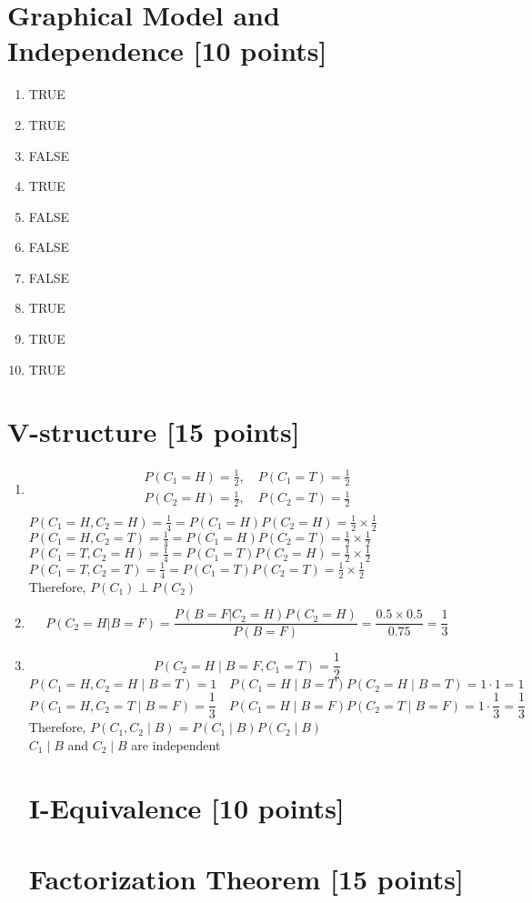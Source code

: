 \documentclass[12pt,a4paper]{article}
\begin{document}
\section{Graphical Model and Independence [10 points]}

\begin{enumerate}
  \item TRUE
  \item TRUE
  \item FALSE
  \item TRUE
  \item FALSE
  \item FALSE
  \item FALSE
  \item TRUE
  \item TRUE
  \item TRUE
\end{enumerate}

\section{V-structure [15 points]}
\begin{enumerate}
  \item
  \begin{align}
  \nonumber P(C_1=H)=\frac{1}{2},\quad P(C_1=T)=\frac{1}{2}\\
  \nonumber P(C_2=H)=\frac{1}{2},\quad P(C_2=T)=\frac{1}{2}\\
  \end{align}
  $P(C_1=H,C_2=H)=\frac{1}{4}=P(C_1=H)P(C_2=H)=\frac{1}{2}\times\frac{1}{2}$\\
  $P(C_1=H,C_2=T)=\frac{1}{4}=P(C_1=H)P(C_2=T)=\frac{1}{2}\times\frac{1}{2}$\\
  $P(C_1=T,C_2=H)=\frac{1}{4}=P(C_1=T)P(C_2=H)=\frac{1}{2}\times\frac{1}{2}$\\
  $P(C_1=T,C_2=T)=\frac{1}{4}=P(C_1=T)P(C_2=T)=\frac{1}{2}\times\frac{1}{2}$\\
  Therefore, $P(C_1)\perp P(C_2)$
  \item
  $$P(C_2=H|B=F)=\frac{P(B=F|C_2=H)P(C_2=H)}{P(B=F)}=\frac{0.5\times0.5}{0.75}=\frac{1}{3}$$
  \item
  $$P(C_2=H\mid B=F,C_1=T)=\frac{1}{2}$$
  $$P(C_1=H,C_2=H\mid B=T)=1\quad P(C_1=H\mid B=T)P(C_2=H\mid B=T)=1\cdot1=1$$
  $$P(C_1=H,C_2=T\mid B=F)=\frac{1}{3}\quad P(C_1=H\mid B=F)P(C_2=T\mid B=F)=1\cdot\frac{1}{3}=\frac{1}{3}$$
  Therefore, $P(C_1,C_2\mid B)=P(C_1\mid B)P(C_2\mid B)$\\
  $C_1\mid B$ and $C_2\mid B$ are independent

\section{I-Equivalence [10 points]}


\section{Factorization Theorem [15 points]}


\end{enumerate}
\end{document}
